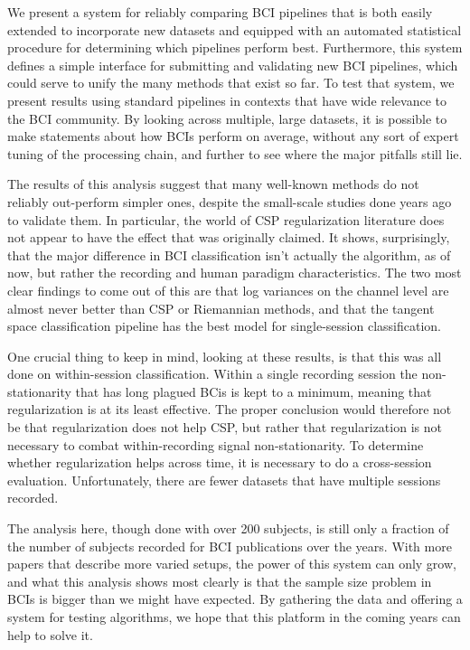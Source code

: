 We present a system for reliably comparing BCI pipelines that is both
easily extended to incorporate new datasets and equipped with an
automated statistical procedure for determining which pipelines
perform best. Furthermore, this system defines a simple interface for
submitting and validating new BCI pipelines, which could serve to
unify the many methods that exist so far. To test that system, we
present results using standard pipelines in contexts that have wide
relevance to the BCI community. By looking across multiple, large
datasets, it is possible to make statements about how BCIs perform on
average, without any sort of expert tuning of the processing chain,
and further to see where the major pitfalls still lie.

The results of this analysis suggest that many well-known methods do
not reliably out-perform simpler ones, despite the small-scale studies
done years ago to validate them. In particular, the world of CSP
regularization literature does not appear to have the effect that was
originally claimed. It shows, surprisingly, that the
major difference in BCI classification isn't actually the algorithm, as of now,
but rather the recording and human paradigm characteristics. The two
most clear findings to come out of this are that log variances on the
channel level are almost never better than CSP or Riemannian methods,
and that the tangent space classification pipeline has the best model
for single-session classification.

One crucial thing to keep in mind, looking at these results, is that
this was all done on within-session classification. Within a single
recording session the non-stationarity that has long plagued BCis is
kept to a minimum, meaning that regularization is at its least
effective. The proper conclusion would therefore not be that
regularization does not help CSP, but rather that regularization is
not necessary to combat within-recording signal non-stationarity. To
determine whether regularization helps across time, it is necessary to
do a cross-session evaluation. Unfortunately, there are fewer datasets
that have multiple sessions recorded.

The analysis here, though done with over 200 subjects, is still only a
fraction of the number of subjects recorded for BCI publications over
the years. With more papers that describe more varied setups, the
power of this system can only grow, and what this analysis shows most
clearly is that the sample size problem in BCIs is bigger than we
might have expected. By gathering the data and offering a system for
testing algorithms, we hope that this platform in the coming years can
help to solve it.

